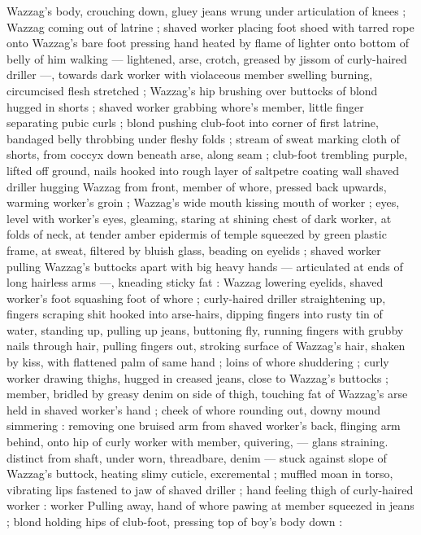 {Wazzag's body, crouching down, gluey jeans wrung under 
articulation of knees ; Wazzag coming out of latrine ; shaved worker 
placing foot shoed with tarred rope onto Wazzag's bare foot 
pressing hand heated by flame of lighter onto bottom of belly of him 
walking --- lightened, arse, crotch, greased by jissom of curly-haired 
driller ---, towards dark worker with violaceous member swelling 
burning, circumcised flesh stretched ; Wazzag's hip brushing over 
buttocks of blond hugged in shorts ; shaved worker grabbing 
whore's member, little finger separating pubic curls ; blond pushing 
club-foot into corner of first latrine, bandaged belly throbbing under 
fleshy folds ; stream of sweat marking cloth of shorts, from coccyx 
down beneath arse, along seam ; club-foot trembling purple, lifted 
off ground, nails hooked into rough layer of saltpetre coating wall 
shaved driller hugging Wazzag from front, member of whore, 
pressed back upwards, warming worker's groin ; Wazzag's wide 
mouth kissing mouth of worker ; eyes, level with worker's eyes, 
gleaming, staring at shining chest of dark worker, at folds of neck, at 
tender amber epidermis of temple squeezed by green plastic frame, 
at sweat, filtered by bluish glass, beading on eyelids ; shaved worker 
pulling Wazzag's buttocks apart with big heavy hands --- articulated 
at ends of long hairless arms ---, kneading sticky fat : Wazzag 
lowering eyelids, shaved worker's foot squashing foot of whore ; 
curly-haired driller straightening up, fingers scraping shit hooked 
into arse-hairs, dipping fingers into rusty tin of water, standing up, 
pulling up jeans, buttoning fly, running fingers with grubby nails 
through hair, pulling fingers out, stroking surface of Wazzag's hair, 
shaken by kiss, with flattened palm of same hand ; loins of whore 
shuddering ; curly worker drawing thighs, hugged in creased jeans, 
close to Wazzag's buttocks ; member, bridled by greasy denim on 
side of thigh, touching fat of Wazzag's arse held in shaved worker's 
hand ; cheek of whore rounding out, downy mound simmering : 
removing one bruised arm from shaved worker's back, flinging arm 
behind, onto hip of curly worker with member, quivering, --- glans 
straining. distinct from shaft, under worn, threadbare, denim --- 
stuck against slope of Wazzag's buttock, heating slimy cuticle, 
excremental ; muffled moan in torso, vibrating lips fastened to jaw of 
shaved driller ; hand feeling thigh of curly-haired worker : worker 
Pulling away, hand of whore pawing at member squeezed in jeans ; 
blond holding hips of club-foot, pressing top of boy's body down : 
}
